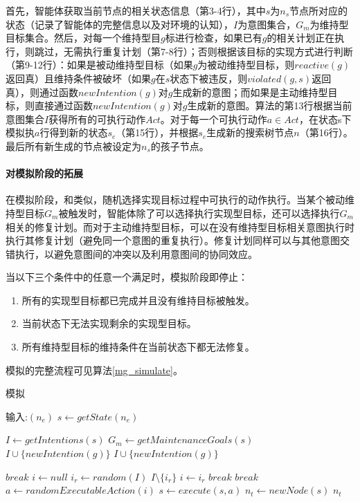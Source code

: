 首先，智能体获取当前节点的相关状态信息（第3-4行），其中$s$为$n_s$节点所对应的状态（记录了智能体的完整信息以及对环境的认知），$I$为意图集合，$G_m$为维持型目标集合。然后，对每一个维持型目$g$标进行检查，如果已有$g$的相关计划正在执行，则跳过，无需执行重复计划（第7-8行）；否则根据该目标的实现方式进行判断（第9-12行）：如果是被动维持型目标（如果$g$为被动维持型目标，则$reactive(g)$返回真）且维持条件被破坏（如果$g$在$s$状态下被违反，则$violated(g,s)$返回真），则通过函数$newIntention(g)$对$g$生成新的意图；而如果是主动维持型目标，则直接通过函数$newIntention(g)$对$g$生成新的意图。算法的第13行根据当前意图集合$I$获得所有的可执行动作$Act$。对于每一个可执行动作$a \in Act$，在状态s下模拟执$a$行得到新的状态$s_e$（第15行），并根据$s_e$生成新的搜索树节点$n$（第16行）。最后所有新生成的节点被设定为$n_s$的孩子节点。

\vspace{1cm}

\paragraph{对模拟阶段的拓展}
在模拟阶段，\SAM 和\SA 类似，随机选择实现目标过程中可执行的动作执行。当某个被动维持型目标$G_m$被触发时，智能体除了可以选择执行实现型目标，还可以选择执行$G_m$相关的修复计划。而对于主动维持型目标，\SAM 可以在没有维持型目标相关意图执行时执行其修复计划（避免同一个意图的重复执行）。修复计划同样可以与其他意图交错执行，以避免意图间的冲突以及利用意图间的协同效应。

当以下三个条件中的任意一个满足时，模拟阶段即停止：
\begin{enumerate}
  \item 所有的实现型目标都已完成并且没有维持目标被触发。
  \item 当前状态下无法实现剩余的实现型目标。
  \item 所有维持型目标的维持条件在当前状态下都无法修复。
\end{enumerate}
模拟的完整流程可见算法\ref{mg_simulate}。

\begin{algorithm}[H]
\caption{模拟}\label{mg_simulate}
\begin{algorithmic}[1]
\STATE 输入:$(n_e)$
\STATE $s \gets getState(n_e)$

  \STATE $I \gets getIntentions(s)$
  \STATE $G_m \gets getMaintenanceGoals(s)$
      \STATE $I \cup \{newIntention(g)\}$
    \ENDIF
      \STATE $I \cup \{newIntention(g)\}$
    \ENDIF
\ENDFOR

  \STATE $break$
\ENDIF
  \STATE $i \gets null$\label{mg_select_intention}
    \STATE $i_r \gets random(I)$
    \STATE $I \setminus \{i_r\}$
      \STATE $i \gets i_r$
      \STATE $break$
    \ENDIF
  \ENDWHILE
    \STATE $break$
  \ENDIF
  \STATE $a \gets randomExecutableAction(i)$
  \STATE $s \gets execute(s, a)$
\ENDWHILE
\STATE $n_t \gets newNode(s)$
\RETURN $n_t$
\end{algorithmic}
\end{algorithm}

